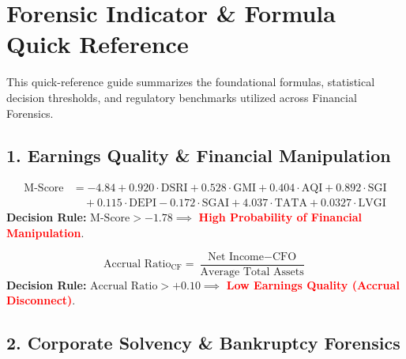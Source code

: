 \chapter*{Forensic Indicator \& Formula Quick Reference}

This quick-reference guide summarizes the foundational formulas, statistical decision thresholds, and regulatory benchmarks utilized across Financial Forensics.

\section*{1. Earnings Quality \& Financial Manipulation}

\begin{tcolorbox}[colback=primarylight, colframe=primarydark, title={\textbf{Beneish M-Score (8-Variable Manipulation Probabilistic Model)}}]
\begin{align*}
\text{M-Score} &= -4.84 + 0.920 \cdot \text{DSRI} + 0.528 \cdot \text{GMI} + 0.404 \cdot \text{AQI} + 0.892 \cdot \text{SGI} \\
&\quad + 0.115 \cdot \text{DEPI} - 0.172 \cdot \text{SGAI} + 4.037 \cdot \text{TATA} + 0.0327 \cdot \text{LVGI}
\end{align*}
\textbf{Decision Rule:} $\text{M-Score} > -1.78 \implies$ \textcolor{red}{\textbf{High Probability of Financial Manipulation}}.
\end{tcolorbox}

\begin{tcolorbox}[colback=tealbg, colframe=tealborder, title={\textbf{Sloan Cash Flow Accrual Ratio}}]
\begin{equation*}
\text{Accrual Ratio}_{\text{CF}} = \frac{\text{Net Income} - \text{CFO}}{\text{Average Total Assets}}
\end{equation*}
\textbf{Decision Rule:} $\text{Accrual Ratio} > +0.10 \implies$ \textcolor{red}{\textbf{Low Earnings Quality (Accrual Disconnect)}}.
\end{tcolorbox}

\section*{2. Corporate Solvency \& Bankruptcy Forensics}

